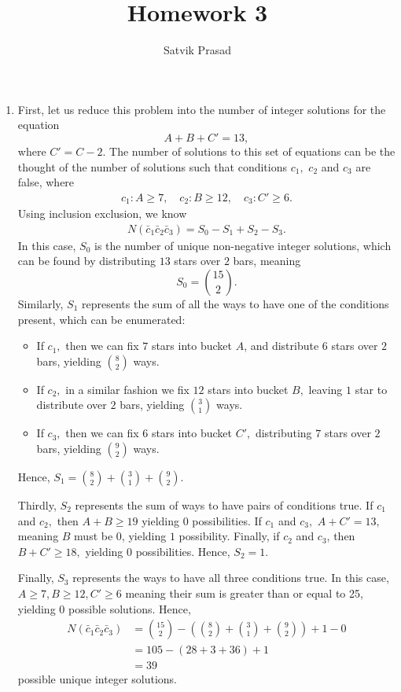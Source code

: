 \documentclass[12pt]{article}
\title{Homework 3}
\author{Satvik Prasad}
\date{}
\begin{document}
\begin{enumerate}
  \item First, let us reduce this problem into the number of integer
    solutions for the equation $$A + B + C' = 13,$$ where $C' = C -
    2.$ The number of solutions to this set of equations can be the
    thought of the number of solutions such that conditions $c_1,$
    $c_2$ and $c_3$ are false, where
    \begin{align*}
      c_1 : A \geq 7, \quad c_2 : B \geq 12, \quad c_3 : C' \geq 6.
    \end{align*}
    Using inclusion exclusion, we know
    \begin{align*}
      N(\bar c_1 \bar c_2 \bar c_3) =  S_0 - S_1 + S_2 - S_3.
    \end{align*}
    In this case, $S_0$ is the number of unique non-negative integer
    solutions, which can be found by distributing $13$ stars over $2$
    bars, meaning $$S_0 = {15 \choose 2}.$$
    Similarly, $S_1$ represents the sum of all the ways to have one
    of the conditions present, which can be enumerated:
    \begin{itemize}
      \item If $c_1,$ then we can fix $7$ stars into bucket $A$, and
        distribute $6$ stars over $2$ bars, yielding ${8 \choose 2}$ ways.
      \item If $c_2,$ in a similar fashion we fix $12$ stars into
        bucket $B,$ leaving $1$ star to distribute over $2$ bars,
        yielding ${3 \choose 1}$ ways.
      \item If $c_3,$ then we can fix $6$ stars into bucket $C',$
        distributing $7$ stars over $2$ bars, yielding ${9 \choose 2}$ ways.
    \end{itemize}
    Hence, $S_1 = {8 \choose 2} + {3 \choose 1} + {9 \choose 2}.$

    Thirdly, $S_2$ represents the sum of ways to have pairs of
    conditions true. If $c_1$ and $c_2,$ then $A + B \geq 19$
    yielding $0$ possibilities. If $c_1$ and $c_3,$ $A + C' = 13,$
    meaning $B$ must be 0, yielding $1$ possibility. Finally, if
    $c_2$ and $c_3$, then $B + C' \geq 18,$ yielding $0$
    possibilities. Hence, $S_2 = 1.$

    Finally, $S_3$ represents the ways to have all three conditions
    true. In this case, $A \geq 7, B \geq 12, C' \geq 6$ meaning
    their sum is greater than or equal to 25, yielding $0$ possible
    solutions. Hence,
    \begin{align*}
      N(\bar c_1 \bar c_2 \bar c_3) &= {15 \choose 2} - \left({8
      \choose 2} + {3 \choose 1} + {9 \choose 2}\right) + 1 - 0 \\
      &= 105 - (28 + 3 + 36) + 1 \\
      &= 39
    \end{align*}
    possible unique integer solutions.


\end{enumerate}
\end{document}
